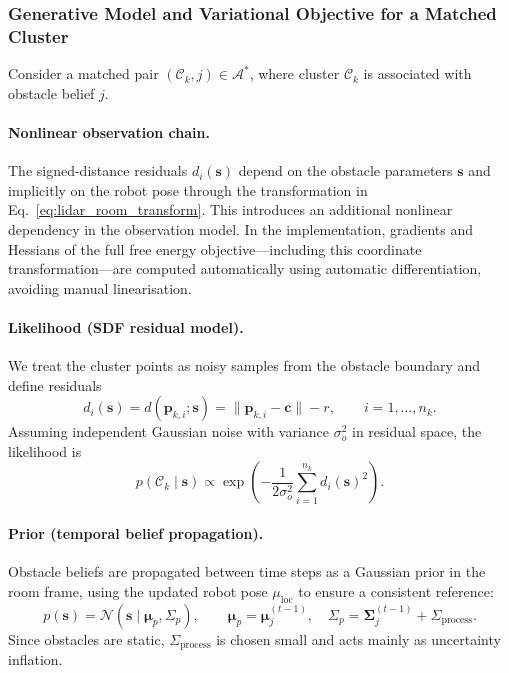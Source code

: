\documentclass[a4paper, twoside]{article}
\begin{document}
\subsubsection{Generative Model and Variational Objective for a Matched Cluster}
\label{sec:obstacle-generative}

Consider a matched pair $(\mathcal{C}_k, j)\in\mathcal{A}^*$, where cluster $\mathcal{C}_k$
is associated with obstacle belief $j$.

\paragraph{Nonlinear observation chain.}
The signed-distance residuals $d_i(\mathbf{s})$ depend on the obstacle parameters
$\mathbf{s}$ and implicitly on the robot pose through the transformation
in Eq.~\eqref{eq:lidar_room_transform}. This introduces an additional nonlinear
dependency in the observation model. In the implementation, gradients and Hessians
of the full free energy objective—including this coordinate transformation—are
computed automatically using automatic differentiation, avoiding manual
linearisation.


\paragraph{Likelihood (SDF residual model).}
We treat the cluster points as noisy samples from the obstacle boundary and define residuals
\begin{equation}
d_i(\mathbf{s}) = d(\mathbf{p}_{k,i};\mathbf{s})=\|\mathbf{p}_{k,i}-\mathbf{c}\|-r,
\qquad i=1,\ldots,n_k.
\end{equation}
Assuming independent Gaussian noise with variance $\sigma_o^2$ in residual space, the likelihood is
\begin{equation}
p(\mathcal{C}_k\mid \mathbf{s})
\propto
\exp\!\left(-\frac{1}{2\sigma_o^2}\sum_{i=1}^{n_k} d_i(\mathbf{s})^2\right).
\label{eq:cluster_likelihood}
\end{equation}

\paragraph{Prior (temporal belief propagation).}
Obstacle beliefs are propagated between time steps as a Gaussian prior in the room frame,
using the updated robot pose $\mu_{\text{loc}}$ to ensure a consistent reference:
\begin{equation}
p(\mathbf{s})=\mathcal{N}(\mathbf{s}\mid \boldsymbol{\mu}_p,\Sigma_p),
\qquad
\boldsymbol{\mu}_p=\boldsymbol{\mu}_j^{(t-1)},\quad
\Sigma_p=\boldsymbol{\Sigma}_j^{(t-1)}+\Sigma_{\text{process}}.
\label{eq:obstacle_prior}
\end{equation}
Since obstacles are static, $\Sigma_{\text{process}}$ is chosen small and acts mainly as uncertainty inflation.
\end{document}
